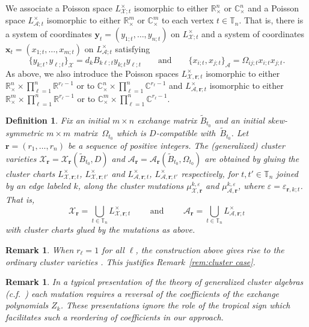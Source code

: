 \documentclass{amsart}
\newtheorem{definition}[theorem]{Definition}
\newtheorem{remark}[theorem]{Remark}
\numberwithin{equation}{section}
\newcommand{\bfr}{{\boldsymbol{r}}}
\newcommand{\bfx}{{\boldsymbol{x}}}
\newcommand{\bfy}{{\boldsymbol{y}}}
\newcommand{\cA}{\mathcal{A}}
\newcommand{\cX}{\mathcal{X}}
\newcommand{\CC}{\mathbb{C}}
\newcommand{\RR}{\mathbb{R}}
\newcommand{\TT}{\mathbb{T}}
\begin{document}
We associate a Poisson space $L^\times_{\cX;t}$ isomorphic to either $\RR_\times^n$ or $\CC_\times^n$ and a Poisson space $L^\times_{\cA;t}$ isomorphic to either $\RR_\times^m$ or $\CC_\times^m$ to each vertex $t\in\TT_n$.
That is, there is a system of coordinates $\bfy_t=(y_{1;t},\ldots,y_{n;t})$ on $L^\times_{\cX;t}$ and a system of coordinates $\bfx_t=(x_{1;t},\ldots,x_{m;t})$ on $L^\times_{\cA;t}$ satisfying
\begin{equation}
  \label{eq:brackets3}
  \{y_{k;t},y_{\ell;t}\}_\cX=d_kB_{k\ell;t}y_{k;t}y_{\ell;t}\qquad\text{and}\qquad\{x_{i;t},x_{j;t}\}_\cA=\Omega_{ij;t}x_{i;t}x_{j;t}.
\end{equation}
As above, we also introduce the Poisson spaces $L^\times_{\cX,\bfr;t}$ isomorphic to either $\RR_\times^n\times\prod_{\ell=1}^n \RR^{r_\ell-1}$ or to $\CC_\times^n\times\prod_{\ell=1}^n \CC^{r_\ell-1}$ and $L^\times_{\cA,\bfr;t}$ isomorphic to either $\RR_\times^m\times\prod_{\ell=1}^n \RR^{r_\ell-1}$ or to $\CC_\times^m\times\prod_{\ell=1}^n \CC^{r_\ell-1}$.

\begin{definition}
  \label{def:cluster varieties}
  Fix an initial $m\times n$ exchange matrix $\tilde B_{t_0}$ and an initial skew-symmetric $m\times m$ matrix~$\Omega_{t_0}$ which is $D$-compatible with~$\tilde B_{t_0}$.
  Let $\bfr=(r_1,\ldots,r_n)$ be a sequence of positive integers.
  The \emph{(generalized) cluster varieties} $\cX_\bfr=\cX_\bfr(\tilde B_{t_0},D)$ and $\cA_\bfr=\cA_\bfr(\tilde B_{t_0},\Omega_{t_0})$ are obtained by gluing the cluster charts $L^\times_{\cX,\bfr;t}$, $L^\times_{\cX,\bfr;t'}$ and $L^\times_{\cA,\bfr;t}$, $L^\times_{\cA,\bfr;t'}$ respectively, for $t,t'\in\TT_n$ joined by an edge labeled $k$, along the cluster mutations $\mu_{\cX,\bfr}^{k,\varepsilon}$ and $\mu_{\cA,\bfr}^{k,\varepsilon}$, where $\varepsilon=\varepsilon_{\bfr,k;t}$.
  That is, 
  \begin{equation}
    \label{eq:cluster varieties}
    \cX_\bfr=\bigcup_{t\in\TT_n} L^\times_{\cX,\bfr;t}\qquad\text{ and }\qquad\cA_\bfr=\bigcup_{t\in\TT_n} L^\times_{\cA,\bfr;t}
  \end{equation}
  with cluster charts glued by the mutations as above.
\end{definition}
\begin{remark}
  \label{rem:cluster case 2}
  When $r_\ell=1$ for all $\ell$, the construction above gives rise to the ordinary cluster varieties \cite{FZ02,FG09a}.
  This justifies Remark~\ref{rem:cluster case}.
\end{remark}
\begin{remark}
  In a typical presentation of the theory of generalized cluster algebras (c.f.\ \cite{NR16, Rup13}) each mutation requires a reversal of the coefficients of the exchange polynomials $Z_k$.
  These presentations ignore the role of the tropical sign which facilitates such a reordering of coefficients in our approach.
\end{remark}
\end{document}
